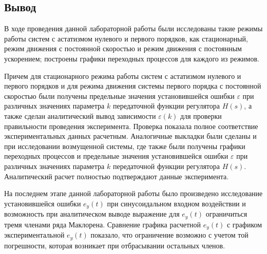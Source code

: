 \documentclass[a4paper, 11pt]{article}
\begin{document}
\newpage
\begin{center}
\section*{Вывод}
\end{center}
\par 
В ходе проведения данной лабораторной работы были исследованы такие режимы работы систем с астатизмом нулевого и первого порядков, как стационарный, режим движения с постоянной скоростью и режим движения с постоянным ускорением; построены графики переходных процессов для каждого из режимов. 
\par 
Причем для стационарного режима работы систем с астатизмом нулевого и первого порядков и для режима движения системы первого порядка с постоянной скоростью были получены предельные значения установившейся ошибки $\varepsilon$ при различных значениях параметра $k$ передаточной функции регулятора $H(s)$, а также сделан аналитический вывод зависимости $\varepsilon(k)$ для проверки правильности проведения эксперимента. Проверка показала полное соответствие экспериментальных данных расчетным. Аналогичные выкладки были сделаны и при исследовании возмущенной системы, где также были получены графики переходных процессов и предельные значения установившейся ошибки $\varepsilon$ при различных значениях параметра $k$ передаточной функции регулятора $H(s)$. Аналитический расчет полностью подтверждают данные эксперимента. 
\par 
На последнем этапе данной лабораторной работы было произведено исследование установившейся ошибки $e_y(t)$ при синусоидальном входном воздействии и возможность при аналитическом выводе выражение для $e_y(t)$ ограничиться тремя членами ряда Маклорена. Сравнение графика расчетной $e_y(t)$ с графиком экспериментальной $e_y(t)$ показало, что ограничение возможно с учетом той погрешности, которая возникает при отбрасывании остальных членов. 
\end{document}
